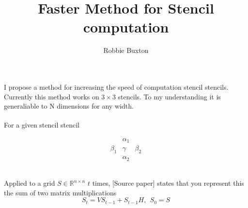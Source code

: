 \documentclass{article}
\begin{document}
\title{Faster Method for Stencil computation}
\author{Robbie Buxton}
\maketitle
I propose a method for increasing the speed of computation stencil stencils. 
Currently this method works on $3\times 3$ stencils. To my understanding it is generaliable to N dimensions for any width. \\
\\
For a given stencil stencil
\newcommand{\stencilTop}{\alpha_{1}}
\newcommand{\stencilLeft}{\beta_{1}}
\newcommand{\stencilMiddle}{\gamma}
\newcommand{\stencilRight}{\beta_{2}}
\newcommand{\stencilBottom}{\alpha_{2}}

\[\begin{matrix} 
	& \stencilTop  & \\
	\stencilLeft  & \stencilMiddle  & \stencilRight  \\
	& \stencilBottom & 
\end{matrix}\] \\

\newcommand{\verticalBands}{V}
\newcommand{\horizontalBands}{H}
\newcommand{\sourceGrid}{S}

Applied to a grid $\sourceGrid \in \mathbb{R}^{n \times n}$ $t$ times,
[Source paper] states that you represent this the sum of two matrix multiplications
\[ \sourceGrid_t = \verticalBands \sourceGrid_{t-1} + \sourceGrid_{t-1} \horizontalBands, \> \> S_0 = S\]
\end{document}
